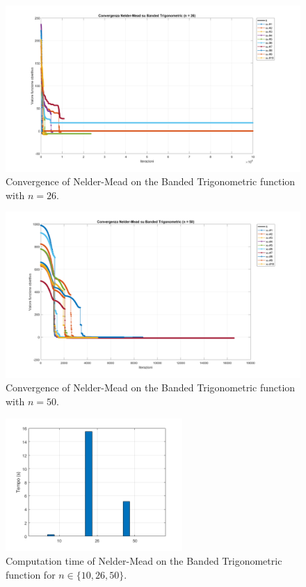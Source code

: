 \documentclass[a4paper,12pt]{article}
\begin{document}
	\begin{figure}[htbp]
		\centering
		\includegraphics[width=\textwidth]{../immagini/banded_26.png}
		\caption{Convergence of Nelder-Mead on the Banded Trigonometric function with $n = 26$.}
		\label{fig:bt_nelder_26}
	\end{figure}
	
	\begin{figure}[htbp]
		\centering
		\includegraphics[width=\textwidth]{../immagini/banded_50.png}
		\caption{Convergence of Nelder-Mead on the Banded Trigonometric function with $n = 50$.}
		\label{fig:bt_nelder_50}
	\end{figure}
	
	\begin{figure}[htbp]
		\centering
		\includegraphics[width=0.6\textwidth]{../immagini/banded_time_nelder.png}
		\caption{Computation time of Nelder-Mead on the Banded Trigonometric function for $n \in \{10, 26, 50\}$.}
		\label{fig:bt_nelder_time}
	\end{figure}
		
\end{document}
